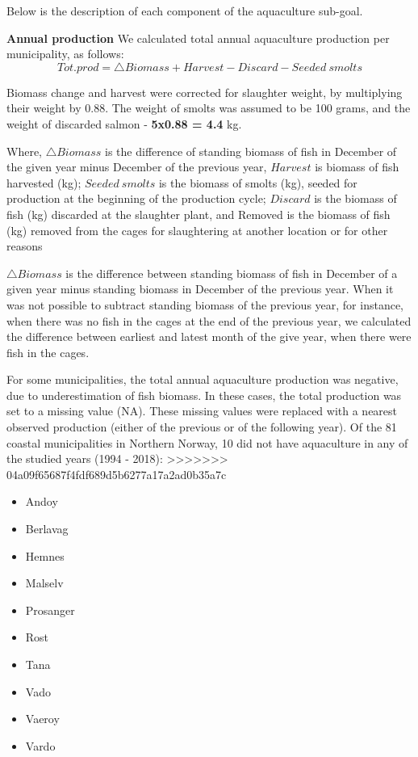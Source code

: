 \documentclass[
]{book}
\providecommand{\tightlist}{%
  \setlength{\itemsep}{0pt}\setlength{\parskip}{0pt}}
\begin{document}
Below is the description of each component of the aquaculture sub-goal.

\textbf{Annual production}
We calculated total annual aquaculture production per municipality, as follows:
\begin{equation}
Tot.prod = \triangle Biomass + Harvest - Discard - Seeded\ smolts
\label{eq:totprod} 
\end{equation}

Biomass change and harvest were corrected for slaughter weight, by multiplying their weight by 0.88.
The weight of smolts was assumed to be 100 grams, and the weight of discarded salmon - \textbf{5x0.88 = 4.4} kg.

Where, \(\triangle Biomass\) is the difference of standing biomass of fish in December of the given year minus December of the previous year, \(Harvest\) is biomass of fish harvested (kg); \(Seeded\ smolts\) is the biomass of smolts (kg), seeded for production at the beginning of the production cycle; \(Discard\) is the biomass of fish (kg) discarded at the slaughter plant, and Removed is the biomass of fish (kg) removed from the cages for slaughtering at another location or for other reasons

\(\triangle Biomass\) is the difference between standing biomass of fish in December of a given year minus standing biomass in December of the previous year. When it was not possible to subtract standing biomass of the previous year, for instance, when there was no fish in the cages at the end of the previous year, we calculated the difference between earliest and latest month of the give year, when there were fish in the cages.

For some municipalities, the total annual aquaculture production was negative, due to underestimation of fish biomass. In these cases, the total production was set to a missing value (NA). These missing values were replaced with a nearest observed production (either of the previous or of the following year).
Of the 81 coastal municipalities in Northern Norway, 10 did not have aquaculture in any of the studied years (1994 - 2018):
\textgreater\textgreater\textgreater\textgreater\textgreater\textgreater\textgreater{} 04a09f65687f4fdf689d5b6277a17a2ad0b35a7c

\begin{itemize}
\tightlist
\item
  Andoy
\item
  Berlavag
\item
  Hemnes
\item
  Malselv
\item
  Prosanger
\item
  Rost
\item
  Tana
\item
  Vado
\item
  Vaeroy
\item
  Vardo
\end{itemize}
\end{document}
